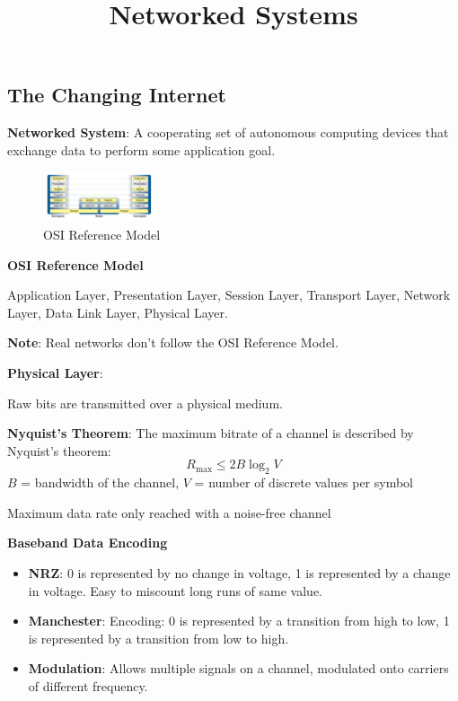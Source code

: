 \documentclass{article}
\title{Networked Systems}
\author{}
\date{}
\begin{document}

\subsection*{The Changing Internet}

\textbf{Networked System}: A cooperating set of autonomous computing devices that exchange data to perform some application goal.

\begin{figure}[h]
    \centering
    \includegraphics[width=0.3\textwidth]{assets/osi-model.png}
    \caption{OSI Reference Model}\label{fig:osi-model}
\end{figure}

\textbf{OSI Reference Model}

Application Layer, Presentation Layer, Session Layer, Transport Layer, Network Layer, Data Link Layer, Physical Layer.

\textbf{Note}: Real networks don't follow the OSI Reference Model.

\vspace{\baselineskip}

\textbf{Physical Layer}:

Raw bits are transmitted over a physical medium.

\textbf{Nyquist's Theorem}: The maximum bitrate of a channel is described by Nyquist's theorem:
\[
R_{\max} \leq 2B \log_2 V
\]
$B$ = bandwidth of the channel,
$V$ = number of discrete values per symbol

Maximum data rate only reached with a noise-free channel

\textbf{Baseband Data Encoding}
\begin{itemize}
    \item \textbf{NRZ}: 0 is represented by no change in voltage, 1 is represented by a change in voltage. Easy to miscount long runs of same value.
    \item \textbf{Manchester}: Encoding: 0 is represented by a transition from high to low, 1 is represented by a transition from low to high.
    \item \textbf{Modulation}: Allows multiple signals on a channel, modulated onto carriers of different frequency.
\end{itemize}
\end{document}

